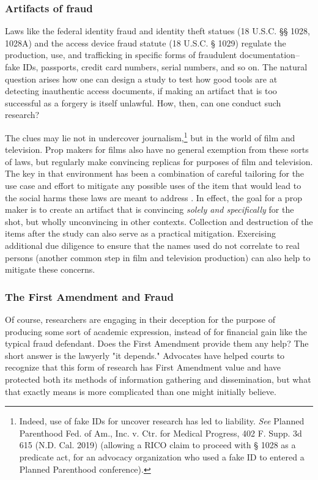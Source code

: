\subsubsection{Artifacts of fraud}
Laws like the federal identity fraud and identity theft statues (18 U.S.C. §§ 1028, 1028A) and the access device fraud statute (18 U.S.C. § 1029) regulate the production, use, and trafficking in specific forms of fraudulent documentation--fake IDs, passports, credit card numbers, serial numbers, and so on. The natural question arises how one can design a study to test how good tools are at detecting inauthentic access documents, if making an artifact that is too successful as a forgery is itself unlawful. How, then, can one conduct such research?

The clues may lie not in undercover journalism,\footnote{Indeed, use of fake IDs for uncover research has led to liability. \textit{See} Planned Parenthood Fed. of Am., Inc. v. Ctr. for Medical Progress, 402 F. Supp. 3d 615 (N.D. Cal. 2019) (allowing a RICO claim to proceed with § 1028 as a predicate act, for an advocacy organization who used a fake ID to entered a Planned Parenthood conference).} but in the world of film and television. Prop makers for films also have no general exemption from these sorts of laws, but regularly make convincing replicas for purposes of film and television. The key in that environment has been a combination of careful tailoring for the use case and effort to mitigate any possible uses of the item that would lead to the social harms these laws are meant to address \cite{geaghan-breiner_how_2022}. In effect, the goal for a prop maker is to create an artifact that is convincing \textit{solely and specifically} for the shot, but wholly unconvincing in other contexts. Collection and destruction of the items after the study can also serve as a practical mitigation. Exercising additional due diligence to ensure that the names used do not correlate to real persons (another common step in film and television production) can also help to mitigate these concerns.

\subsubsection{The First Amendment and Fraud}
Of course, researchers are engaging in their deception for the purpose of producing some sort of academic expression, instead of for financial gain like the typical fraud defendant. Does the First Amendment provide them any help? The short answer is the lawyerly "it depends." Advocates have helped courts to recognize that this form of research has First Amendment value and have protected both its methods of information gathering and dissemination, but what that exactly means is more complicated than one might initially believe.

